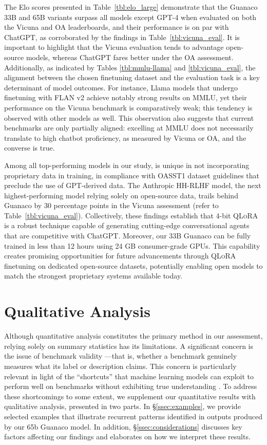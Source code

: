 The Elo scores presented in Table~\ref{tbl:elo_large} demonstrate that the {Guanaco} 33B and 65B variants surpass all models except GPT-4 when evaluated on both the Vicuna and OA leaderboards, and their performance is on par with ChatGPT, as corroborated by the findings in Table~\ref{tbl:vicuna_eval}. It is important to highlight that the Vicuna evaluation tends to advantage open-source models, whereas ChatGPT fares better under the OA assessment. Additionally, as indicated by Tables \ref{tbl:mmlu-llama} and \ref{tbl:vicuna_eval}, the alignment between the chosen finetuning dataset and the evaluation task is a key determinant of model outcomes. For instance, Llama models that undergo finetuning with FLAN v2 achieve notably strong results on MMLU, yet their performance on the Vicuna benchmark is comparatively weak; this tendency is observed with other models as well. This observation also suggests that current benchmarks are only partially aligned: excelling at MMLU does not necessarily translate to high chatbot proficiency, as measured by Vicuna or OA, and the converse is true.

Among all top-performing models in our study,  is unique in not incorporating proprietary data in training, in compliance with OASST1 dataset guidelines that preclude the use of GPT-derived data. The Anthropic HH-RLHF model, the next highest-performing model relying solely on open-source data, trails behind {Guanaco} by 30 percentage points in the Vicuna assessment (refer to Table~\ref{tbl:vicuna_eval}). Collectively, these findings establish that 4-bit \textsc{QLoRA} is a robust technique capable of generating cutting-edge conversational agents that are competitive with ChatGPT. Moreover, our 33B {Guanaco} can be fully trained in less than 12 hours using 24 GB consumer-grade GPUs. This capability creates promising opportunities for future advancements through \textsc{QLoRA} finetuning on dedicated open-source datasets, potentially enabling open models to match the strongest proprietary systems available today.

\section{Qualitative Analysis}

Although quantitative analysis constitutes the primary method in our assessment, relying solely on summary statistics has its limitations. A significant concern is the issue of benchmark validity \citep{liao2021we}—that is, whether a benchmark genuinely measures what its label or description claims. This concern is particularly relevant in light of the ``shortcuts'' that machine learning models can exploit to perform well on benchmarks without exhibiting true understanding \citep{gururangan2018annotation, poliak2018hypothesis}. To address these shortcomings to some extent, we supplement our quantitative results with qualitative analysis, presented in two parts. In \S\ref{ssec:examples}, we provide selected examples that illustrate recurrent patterns identified in outputs produced by our 65b {Guanaco} model. In addition, \S\ref{ssec:considerations} discusses key factors affecting our findings and elaborates on how we interpret these results.

